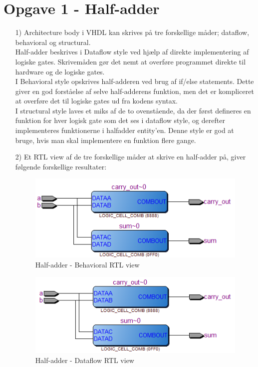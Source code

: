 \section{Opgave 1 - Half-adder}
\begin{enumerate}
	\item[1)]
	Architecture body i VHDL kan skrives på tre forskellige måder; dataflow, behavioral og structural. \\
	Half-adder beskrives i Dataflow style ved hjælp af direkte implementering af logiske gates. Skrivemåden gør det nemt at overføre programmet direkte til hardware og de logiske gates. \\
	I Behavioral style opskrives half-adderen ved brug af if/else statements. Dette giver en god forståelse af selve half-adderens funktion, men det er kompliceret at overføre det til logiske gates ud fra kodens syntax. \\
	I structural style laves et miks af de to ovenstående, da der først defineres en funktion for hver logisk gate som det ses i dataflow style, og derefter implementeres funktionerne i halfadder entity’en. Denne style er god at bruge, hvis man skal implementere en funktion flere gange.\\
	\item[2)]
	Et RTL view af de tre forskellige måder at skrive en half-adder på, giver følgende forskellige resultater:\\
\begin{figure}[h]
	\centering
\includegraphics[scale=0.8]{pictures/Oevelse1/Half_adder/Behavioral.JPG}
\caption{Half-adder - Behavioral RTL view}
\label{fig:HaBehavioralRTL}
\end{figure}

\begin{figure}[h]
	\centering
	\includegraphics[scale=0.8]{pictures/Oevelse1/Half_adder/dataflow.JPG}
	\caption{Half-adder - Dataflow RTL view}
	\label{fig:HaDataflowRTL}
\end{figure}


\end{enumerate}
